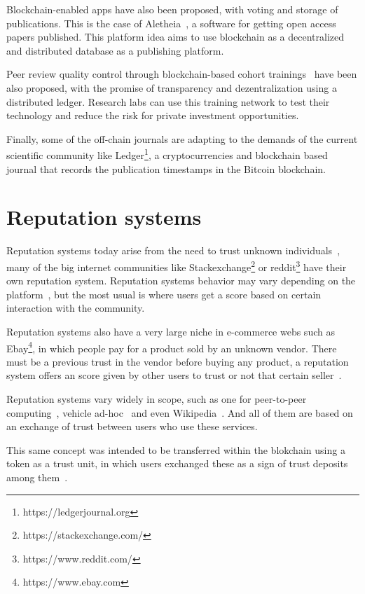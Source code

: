 Blockchain-enabled apps have also been proposed, with voting and storage of
publications. This is the case of Aletheia~\cite{morton2017aletheia}, a software
for getting open access papers published. This platform idea aims to use
blockchain as a decentralized and distributed database as a publishing platform.

Peer review quality control through blockchain-based cohort
trainings~\cite{dhillon2016bench} have been also proposed, with the promise of
transparency and dezentralization using a distributed ledger. Research labs can
use this training network to test their technology and reduce the risk for
private investment opportunities.

Finally, some of the off-chain journals are adapting to the demands of the
current scientific community like Ledger\footnote{https://ledgerjournal.org}, a
cryptocurrencies and blockchain based journal that records the publication
timestamps in the Bitcoin blockchain.

\section{Reputation systems}

Reputation systems today arise from the need to trust unknown
individuals~\cite{resnick2000reputation}, many of the big internet communities
like Stackexchange\footnote{https://stackexchange.com/} or
reddit\footnote{https://www.reddit.com/} have their own reputation system.
Reputation systems behavior may vary depending on the
platform~\cite{josang2002beta}, but the most usual is where users get a score
based on certain interaction with the community.

Reputation systems also have a very large niche in e-commerce webs such as
Ebay\footnote{https://www.ebay.com}, in which people pay for a product sold by
an unknown vendor. There must be a previous trust in the vendor before buying
any product, a reputation system offers an score given by other users to trust
or not that certain seller~\cite{resnick2002trust}.

Reputation systems vary widely in scope, such as one for peer-to-peer
computing~\cite{zhou2007powertrust}, vehicle ad-hoc~\cite{dotzer2005vars} and
even Wikipedia~\cite{adler2007content}. And all of them are based on an exchange
of trust between users who use these services.

This same concept was intended to be transferred within the blokchain using a
token as a trust unit, in which users exchanged these as a sign of trust
deposits among them~\cite{sharples2016blockchain}.


